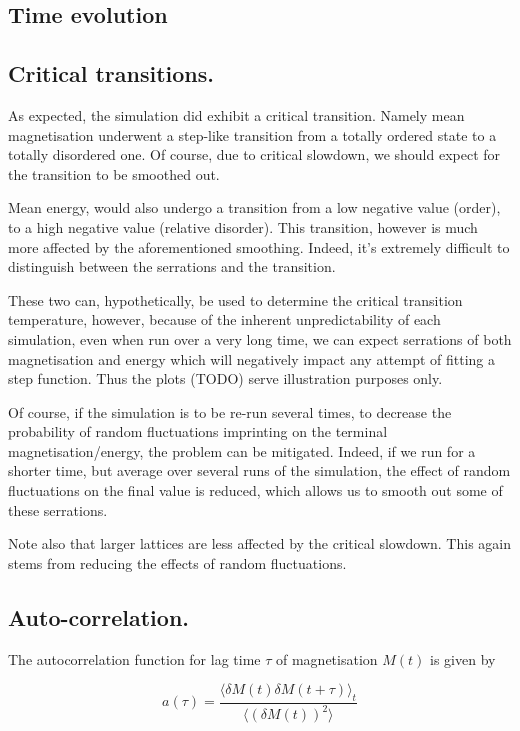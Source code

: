 \documentclass[12pt]{article}
\begin{document}
\subsection{Time evolution}\label{sec:time_evolution}



\subsection{Critical transitions.}

As expected, the simulation did exhibit a critical transition. Namely mean magnetisation underwent a step-like transition from a totally ordered state to a totally disordered one. Of course, due to critical slowdown, we should expect for the transition to be smoothed out.

Mean energy, would also undergo a transition from a low negative value (order), to a high negative value (relative disorder). This transition, however is much more affected by the aforementioned smoothing. Indeed, it's extremely difficult to distinguish between the serrations and the transition. 

These two can, hypothetically,  be used to determine the critical transition temperature, however, because of the inherent unpredictability of each simulation, even when run over a very long time, we can expect serrations of both magnetisation and energy which will negatively impact any attempt of fitting a step function. Thus the plots (TODO) serve illustration purposes only.

Of course, if the simulation is to be re-run several times, to decrease the probability of random fluctuations imprinting on the terminal magnetisation/energy, the problem can be mitigated. Indeed, if we run for a shorter time, but average over several runs of the simulation, the effect of random fluctuations on the final value is reduced, which allows us to smooth out some of these serrations. 

Note also that larger lattices are less affected by the critical slowdown. This again stems from reducing the effects of random fluctuations. 

\subsection{Auto-correlation.}

The autocorrelation function for lag time \(\tau \) of magnetisation \(M(t)\) is given by

\begin{equation}
  a(\tau ) = \frac{\langle  \delta M(t) \delta M(t+ \tau) \rangle_t } {\langle  {(\delta M(t))}^2  \rangle}
\end{equation}
\end{document}
